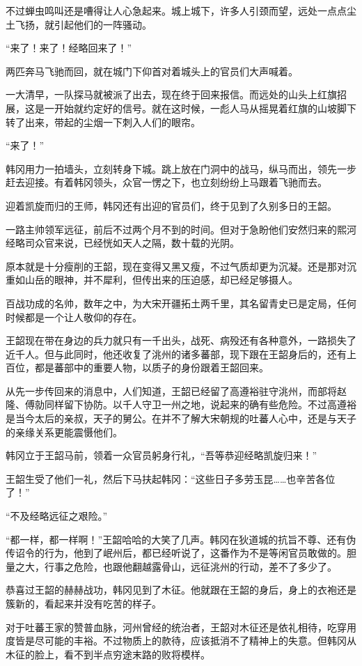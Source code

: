 不过蝉虫鸣叫还是嘈得让人心急起来。城上城下，许多人引颈而望，远处一点点尘土飞扬，就引起他们的一阵骚动。

“来了！来了！经略回来了！”

两匹奔马飞驰而回，就在城门下仰首对着城头上的官员们大声喊着。

一大清早，一队探马就被派了出去，现在终于回来报信。而远处的山头上红旗招展，这是一开始就约定好的信号。就在这时候，一彪人马从摇晃着红旗的山坡脚下转了出来，带起的尘烟一下刺入人们的眼帘。

“来了！”

韩冈用力一拍墙头，立刻转身下城。跳上放在门洞中的战马，纵马而出，领先一步赶去迎接。有着韩冈领头，众官一愣之下，也立刻纷纷上马跟着飞驰而去。

迎着凯旋而归的王师，韩冈还有出迎的官员们，终于见到了久别多日的王韶。

一路主帅领军远征，前后不过两个月不到的时间。但对于急盼他们安然归来的熙河经略司众官来说，已经恍如天人之隔，数十载的光阴。

原本就是十分瘦削的王韶，现在变得又黑又瘦，不过气质却更为沉凝。还是那对沉重如山岳的眼神，并不犀利，但传出来的压迫感，却已经足够摄人。

百战功成的名帅，数年之中，为大宋开疆拓土两千里，其名留青史已是定局，任何时候都是一个让人敬仰的存在。

王韶现在带在身边的兵力就只有一千出头，战死、病殁还有各种意外，一路损失了近千人。但与此同时，他还收复了洮州的诸多蕃部，现下跟在王韶身后的，还有上百位，都是蕃部中的重要人物，以质子的身份跟着王韶回来。

从先一步传回来的消息中，人们知道，王韶已经留了高遵裕驻守洮州，而部将赵隆、傅勍同样留下协防。以千人守卫一州之地，说起来的确有些危险。不过高遵裕是当今太后的亲叔，天子的舅公。在并不了解大宋朝规的吐蕃人心中，还是与天子的亲缘关系更能震慑他们。

韩冈立于王韶马前，领着一众官员躬身行礼，“吾等恭迎经略凯旋归来！”

王韶生受了他们一礼，然后下马扶起韩冈：“这些日子多劳玉昆……也辛苦各位了！”

“不及经略远征之艰险。”

“都一样，都一样啊！”王韶哈哈的大笑了几声。韩冈在狄道城的抗旨不尊、还有伪传诏令的行为，他到了岷州后，都已经听说了，这番作为不是等闲官员敢做的。胆量之大，行事之危险，也跟他翻越露骨山，远征洮州的行动，差不了多少了。

恭喜过王韶的赫赫战功，韩冈见到了木征。他就跟在王韶的身后，身上的衣袍还是簇新的，看起来并没有吃苦的样子。

对于吐蕃王家的赞普血脉，河州曾经的统治者，王韶对木征还是依礼相待，吃穿用度皆是尽可能的丰裕。不过物质上的款待，应该抵消不了精神上的失意。但韩冈从木征的脸上，看不到半点穷途末路的败将模样。

